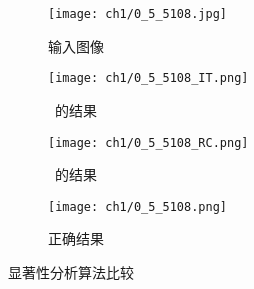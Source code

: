 \begin{figure}[ht]
  \centering%
  \begin{subfigure}{0.2\textwidth}
    \texttt{[image: ch1/0\_5\_5108.jpg]}
    \caption{输入图像}
    \label{fig:saliencyInput}
  \end{subfigure}%
  \hspace{0.1in}%
  \begin{subfigure}{0.2\textwidth}
    \texttt{[image: ch1/0\_5\_5108\_IT.png]}
    \caption{~的结果}
    \label{fig:ITRes}
  \end{subfigure}
  \hspace{0.05in}%
   \begin{subfigure}{0.2\textwidth}
    \texttt{[image: ch1/0\_5\_5108\_RC.png]}
    \caption{~的结果}
    \label{fig:RCRes}
  \end{subfigure}
  \hspace{0.05in}%
   \begin{subfigure}{0.2\textwidth}
    \texttt{[image: ch1/0\_5\_5108.png]}
    \caption{正确结果}
    \label{fig:GT}
  \end{subfigure}
  \hspace{0.05in}%
  \caption{显著性分析算法比较}
  \label{fig:SaliencyOverview}
\end{figure}



